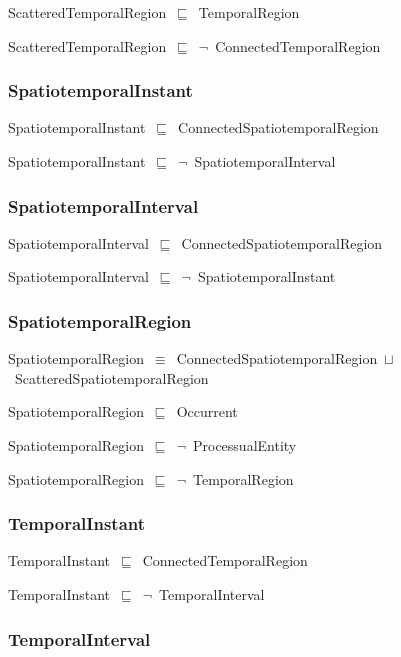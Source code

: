 \documentclass{article}
\begin{document}
ScatteredTemporalRegion~\ensuremath{\sqsubseteq}~TemporalRegion~

ScatteredTemporalRegion~\ensuremath{\sqsubseteq}~\ensuremath{\lnot}~ConnectedTemporalRegion

\subsubsection*{SpatiotemporalInstant}

SpatiotemporalInstant~\ensuremath{\sqsubseteq}~ConnectedSpatiotemporalRegion~

SpatiotemporalInstant~\ensuremath{\sqsubseteq}~\ensuremath{\lnot}~SpatiotemporalInterval

\subsubsection*{SpatiotemporalInterval}

SpatiotemporalInterval~\ensuremath{\sqsubseteq}~ConnectedSpatiotemporalRegion~

SpatiotemporalInterval~\ensuremath{\sqsubseteq}~\ensuremath{\lnot}~SpatiotemporalInstant

\subsubsection*{SpatiotemporalRegion}

SpatiotemporalRegion~\ensuremath{\equiv}~ConnectedSpatiotemporalRegion~\ensuremath{\sqcup}~ScatteredSpatiotemporalRegion

SpatiotemporalRegion~\ensuremath{\sqsubseteq}~Occurrent~

SpatiotemporalRegion~\ensuremath{\sqsubseteq}~\ensuremath{\lnot}~ProcessualEntity

SpatiotemporalRegion~\ensuremath{\sqsubseteq}~\ensuremath{\lnot}~TemporalRegion

\subsubsection*{TemporalInstant}

TemporalInstant~\ensuremath{\sqsubseteq}~ConnectedTemporalRegion~

TemporalInstant~\ensuremath{\sqsubseteq}~\ensuremath{\lnot}~TemporalInterval

\subsubsection*{TemporalInterval}
\end{document}
